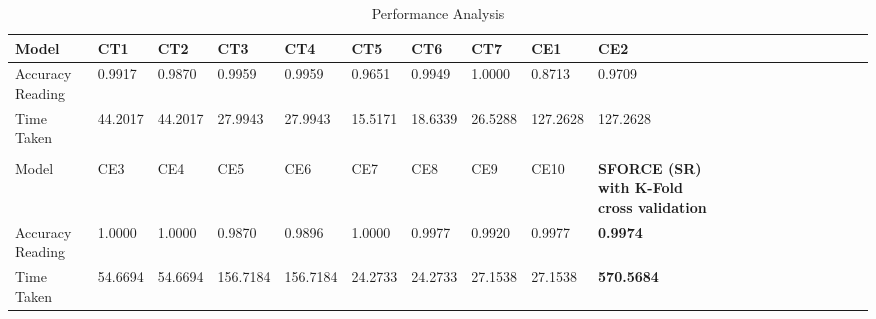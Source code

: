 \documentclass[10pt,journal,compsoc]{IEEEtran}
\begin{document}
\begin{table}[!t]
\caption{Performance Analysis}
\label{table:t1}
\centering
\scalebox{0.7}
{
\begin{tabular}{| l | l | l | l | l | l | l | l | l | l | l | l | l | l | l | l | l | l | l | l |}
\hline
{Model} & {CT1} & {CT2} & {CT3} & {CT4} & {CT5} & {CT6} & {CT7} & {CE1} & {CE2}\\
\hline
Accuracy Reading  & 0.9917 & 0.9870 & 0.9959 & 0.9959 & 0.9651 & 0.9949 & 1.0000 & 0.8713 & 0.9709\\
\hline
Time Taken & 44.2017 & 44.2017 & 27.9943 & 27.9943 & 15.5171 & 18.6339 & 26.5288 & 127.2628 & 127.2628\\
\hline
&&&&&&&&&\\
\hline
{Model} & {CE3} & {CE4} & {CE5} & {CE6} & {CE7} & {CE8} & {CE9} & {CE10} & \textbf{SFORCE (SR) with K-Fold cross validation} \\
\hline
Accuracy Reading  & 1.0000 & 1.0000 & 0.9870 & 0.9896 & 1.0000 & 0.9977 & 0.9920 & 0.9977 & \textbf{0.9974} \\
\hline
Time Taken & 54.6694 & 54.6694 & 156.7184 & 156.7184 & 24.2733 & 24.2733 & 27.1538 & 27.1538 & \textbf{570.5684} \\
\hline
\end{tabular}
}
\end{table}
% 
\end{document}
